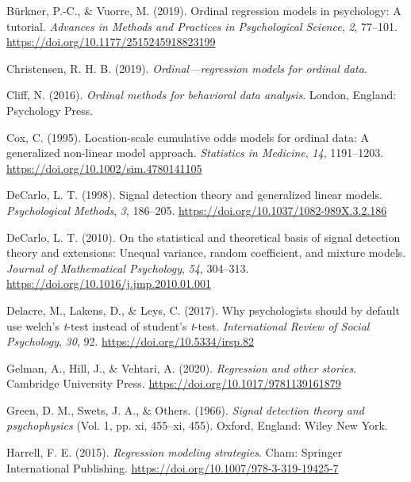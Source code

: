 \documentclass[
  man,floatsintext]{apa6}
\newlength{\cslhangindent}
\newenvironment{CSLReferences}[2] %
 {\begin{list}{}{%
  \setlength{\itemindent}{0pt}
  \setlength{\leftmargin}{0pt}
  \setlength{\parsep}{0pt}
  \ifodd #1
   \setlength{\leftmargin}{\cslhangindent}
   \setlength{\itemindent}{-1\cslhangindent}
  \fi
  \setlength{\itemsep}{#2\baselineskip}}}
 {\end{list}}
\begin{document}
\label{refs}
\begin{CSLReferences}{1}{0}
Bürkner, P.-C., \& Vuorre, M. (2019). Ordinal regression models in psychology: A tutorial. \emph{Advances in Methods and Practices in Psychological Science}, \emph{2}, 77--101. \url{https://doi.org/10.1177/2515245918823199}

Christensen, R. H. B. (2019). \emph{Ordinal---regression models for ordinal data}.

Cliff, N. (2016). \emph{Ordinal methods for behavioral data analysis}. London, England: Psychology Press.

Cox, C. (1995). Location-scale cumulative odds models for ordinal data: A generalized non-linear model approach. \emph{Statistics in Medicine}, \emph{14}, 1191--1203. \url{https://doi.org/10.1002/sim.4780141105}

DeCarlo, L. T. (1998). Signal detection theory and generalized linear models. \emph{Psychological Methods}, \emph{3}, 186--205. \url{https://doi.org/10.1037/1082-989X.3.2.186}

DeCarlo, L. T. (2010). On the statistical and theoretical basis of signal detection theory and extensions: Unequal variance, random coefficient, and mixture models. \emph{Journal of Mathematical Psychology}, \emph{54}, 304--313. \url{https://doi.org/10.1016/j.jmp.2010.01.001}

Delacre, M., Lakens, D., \& Leys, C. (2017). Why psychologists should by default use welch's \emph{t}-test instead of student's \emph{t}-test. \emph{International Review of Social Psychology}, \emph{30}, 92. \url{https://doi.org/10.5334/irsp.82}

Gelman, A., Hill, J., \& Vehtari, A. (2020). \emph{Regression and other stories}. Cambridge University Press. \url{https://doi.org/10.1017/9781139161879}

Green, D. M., Swets, J. A., \& Others. (1966). \emph{Signal detection theory and psychophysics} (Vol. 1, pp. xi, 455--xi, 455). Oxford, England: Wiley New York.

Harrell, F. E. (2015). \emph{Regression modeling strategies}. Cham: Springer International Publishing. \url{https://doi.org/10.1007/978-3-319-19425-7}


\end{CSLReferences}
\end{document}
